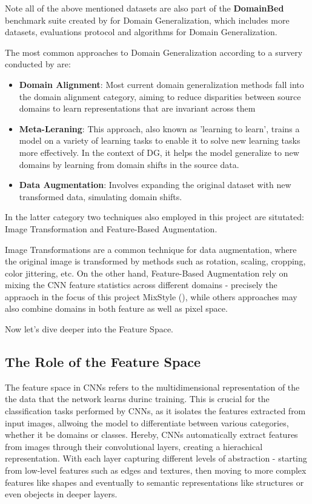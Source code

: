 Note all of the above mentioned datasets are also part of the \textbf{DomainBed} benchmark suite created by \cite{gulrajaniSearchLostDomain2020} for Domain Generalization, which includes more datasets, evaluations protocol and algorithms for Domain Generalization.

The most common approaches to Domain Generalization according to a survery conducted by \cite{zhouDomainGeneralizationSurvey2022} are:
\begin{itemize}
 \item \textbf{Domain Alignment}: Most current domain generalization methods fall into the domain alignment category, aiming to reduce disparities between source domains to learn representations that are invariant across them
 \item \textbf{Meta-Leraning}: This approach, also known as 'learning to learn', trains a model on a variety of learning tasks to enable it to solve new learning tasks more effectively. In the context of DG, it helps the model generalize to new domains by learning from domain shifts in the source data.
 \item \textbf{Data Augmentation}: Involves expanding the original dataset with new transformed data, simulating domain shifts.
\end{itemize}

In the latter category two techniques also employed in this project are situtated:
Image Transformation and Feature-Based Augmentation.

Image Transformations are a common technique for data augmentation, where the original image is transformed by methods such as rotation, scaling, cropping, color jittering, etc.
On the other hand, Feature-Based Augmentation rely on mixing the CNN feature statistics across different domains - precisely the appraoch in the focus of this project MixStyle (\cite{zhouMixStyleNeuralNetworks2023}), while others approaches may also combine domains in both feature as well as pixel space.

Now let's dive deeper into the Feature Space.
\subsection{The Role of the Feature Space}
The feature space in CNNs refers to the multidimensional representation of the the data that the network learns durinc training. This is crucial for the classification tasks performed by CNNs, as it isolates the features extracted from input images, allwoing the model to differentiate between various categories, whether it be domains or classes.
Hereby, CNNs automatically extract features from images through their convolutional layers, creating a hierachical representation. With each layer capturing different levels of abstraction - starting from low-level features such as edges and textures, then moving to more complex features like shapes and eventually to semantic representations like structures or even obejects in deeper layers. \cite{zeilerVisualizingUnderstandingConvolutional2013,goodfellowDeepLearning2016}

